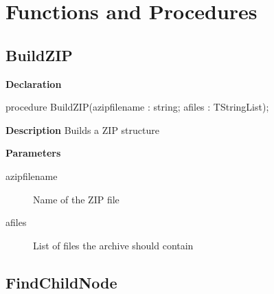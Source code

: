 \documentclass{report}
\newif\ifpdf
\begin{document}
\section{Functions and Procedures}
\ifpdf
\subsection*{\large{\textbf{BuildZIP}}\normalsize\hspace{1ex}\hrulefill}
\else
\subsection*{BuildZIP}
\fi
\label{ipkbuild-BuildZIP}
\begin{list}{}{
\setlength{\itemindent}{0cm}
\setlength{\listparindent}{0cm}
\setlength{\leftmargin}{\evensidemargin}
\addtolength{\leftmargin}{\tmplength}
\settowidth{\labelsep}{X}
\addtolength{\leftmargin}{\labelsep}
\setlength{\labelwidth}{\tmplength}
}
\item[\textbf{Declaration}\hfill]
\ifpdf
\begin{flushleft}
\fi
\begin{ttfamily}
procedure BuildZIP(azipfilename : string; afiles : TStringList);\end{ttfamily}

\ifpdf
\end{flushleft}
\fi

\par
\item[\textbf{Description}]
Builds a ZIP structure  \par
\item[\textbf{Parameters}]
\begin{description}
\item[azipfilename] Name of the ZIP file
\item[afiles] List of files the archive should contain
\end{description}


\end{list}
\ifpdf
\subsection*{\large{\textbf{FindChildNode}}\normalsize\hspace{1ex}\hrulefill}
\else
\end{document}
